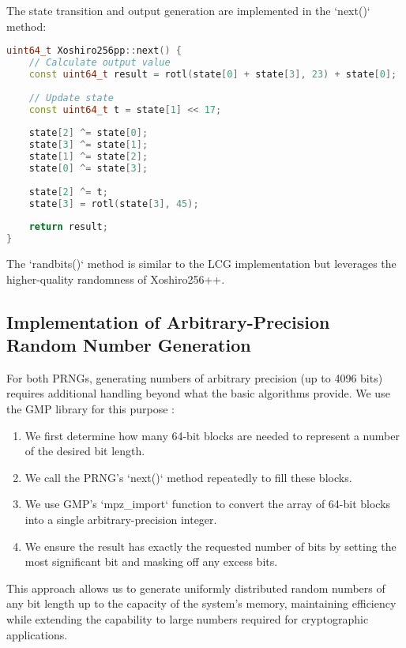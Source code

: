 The state transition and output generation are implemented in the `next()` method:

\begin{lstlisting}[language=C++, caption=Xoshiro256++ Implementation (Core Function)]
uint64_t Xoshiro256pp::next() {
    // Calculate output value
    const uint64_t result = rotl(state[0] + state[3], 23) + state[0];
    
    // Update state
    const uint64_t t = state[1] << 17;
    
    state[2] ^= state[0];
    state[3] ^= state[1];
    state[1] ^= state[2];
    state[0] ^= state[3];
    
    state[2] ^= t;
    state[3] = rotl(state[3], 45);
    
    return result;
}
\end{lstlisting}

The `randbits()` method is similar to the LCG implementation but leverages the higher-quality randomness of Xoshiro256++.

\subsection{Implementation of Arbitrary-Precision Random Number Generation}

For both PRNGs, generating numbers of arbitrary precision (up to 4096 bits) requires additional handling beyond what the basic algorithms provide. We use the GMP library for this purpose \cite{granlund2012}:

\begin{enumerate}
    \item We first determine how many 64-bit blocks are needed to represent a number of the desired bit length.
    
    \item We call the PRNG's `next()` method repeatedly to fill these blocks.
    
    \item We use GMP's `mpz_import` function to convert the array of 64-bit blocks into a single arbitrary-precision integer.
    
    \item We ensure the result has exactly the requested number of bits by setting the most significant bit and masking off any excess bits.
\end{enumerate}

This approach allows us to generate uniformly distributed random numbers of any bit length up to the capacity of the system's memory, maintaining efficiency while extending the capability to large numbers required for cryptographic applications.

